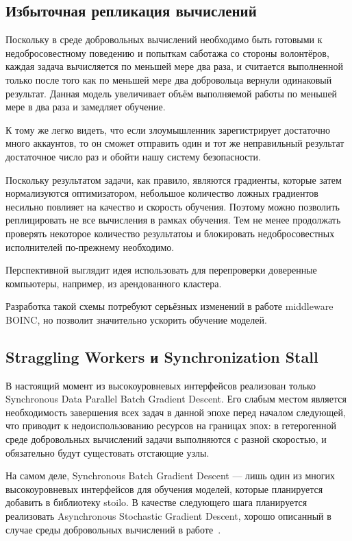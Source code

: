 \documentclass[a4paper,12pt]{extarticle}
\begin{document}
\subsection{Избыточная репликация вычислений}

Поскольку в среде добровольных вычислений необходимо быть готовыми к недобросовестному поведению и попыткам саботажа со стороны волонтёров, каждая задача вычисляется по меньшей мере два раза, и считается выполненной только после того как по меньшей мере два добровольца вернули одинаковый результат.
Данная модель увеличивает объём выполняемой работы по меньшей мере в два раза и замедляет обучение.

К тому же легко видеть, что если злоумышленник зарегистрирует достаточно много аккаунтов, то он сможет отправить один и тот же неправильный результат достаточное число раз и обойти нашу систему безопасности.

Поскольку результатом задачи, как правило, являются градиенты, которые затем нормализуются оптимизатором, небольшое количество ложных градиентов несильно повлияет на качество и скорость обучения. Поэтому можно позволить реплицировать не все вычисления в рамках обучения. Тем не менее продолжать проверять некоторое количество результатоы и блокировать недобросовестных исполнителей по-прежнему необходимо.

Перспективной выглядит идея использовать для перепроверки доверенные компьютеры, например, из арендованного кластера.

Разработка такой схемы потребуют серьёзных изменений в работе middleware BOINC, но позволит значительно ускорить обучение моделей.

\subsection{Straggling Workers и Synchronization Stall}

В настоящий момент из высокоуровневых интерфейсов реализован только Synchronous Data Parallel Batch Gradient Descent. Его слабым местом является необходимость завершения всех задач в данной эпохе перед началом следующей, что приводит к недоиспользованию ресурсов на границах эпох: в гетерогенной среде добровольных вычислений задачи выполняются с разной скоростью, и обязательно будут сущестовать отстающие узлы.

На самом деле, Synchronous Batch Gradient Descent — лишь один из многих высокоуровневых интерфейсов для обучения моделей, которые планируется добавить в библиотеку stoilo. В качестве следующего шага планируется реализовать Asynchronous Stochastic Gradient Descent, хорошо описанный в случае среды добровольных вычислений в работе~\cite{atre2021distributed}.
\end{document}
